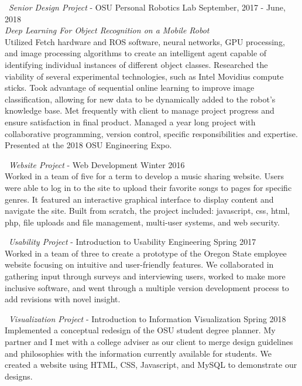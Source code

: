 \documentclass{res}
\begin{document}
\begin{resume}
\textbullet \ {\sl Senior Design Project} - OSU Personal Robotics Lab \hfill September, 2017 - June, 2018 \\
{\sl Deep Learning For Object Recognition on a Mobile Robot} \\
Utilized Fetch hardware and ROS software, neural networks, GPU processing, and image processing algorithms to create an intelligent agent capable of identifying individual instances of different object classes. Researched the viability of several experimental technologies, such as Intel Movidius compute sticks. Took advantage of sequential online learning to improve image classification, allowing for new data to be dynamically added to the robot's knowledge base. Met frequently with client to manage project progress and ensure satisfaction in final product. Managed a year long project with collaborative programming, version control, specific responsibilities and expertise. Presented at the 2018 OSU Engineering Expo. 

\textbullet \ {\sl Website Project} - Web Development \hfill Winter 2016\\
Worked in a team of five for a term to develop a music sharing website. Users were able to log in to the site to upload their favorite songs to pages for specific genres. It featured an interactive graphical interface to display content and navigate the site. Built from scratch, the project included: javascript, css, html, php, file uploads and file management, multi-user systems, and web security.  

\textbullet \ {\sl Usability Project} - Introduction to Usability Engineering \hfill Spring 2017 \\
Worked in a team of three to create a prototype of the Oregon State employee website focusing on intuitive and user-friendly features. We collaborated in gathering input through surveys and interviewing users, worked to make more inclusive software, and went through a multiple version development process to add revisions with novel insight. 

\textbullet \ {\sl Visualization Project} - Introduction to Information Visualization \hfill Spring 2018 \\
Implemented a conceptual redesign of the OSU student degree planner. My partner and I met with a college adviser as our client to merge design guidelines and philosophies with the information currently available for students. We created a website using HTML, CSS, Javascript, and MySQL to demonstrate our designs. 

\end{resume}
\vfill %
\end{document}
